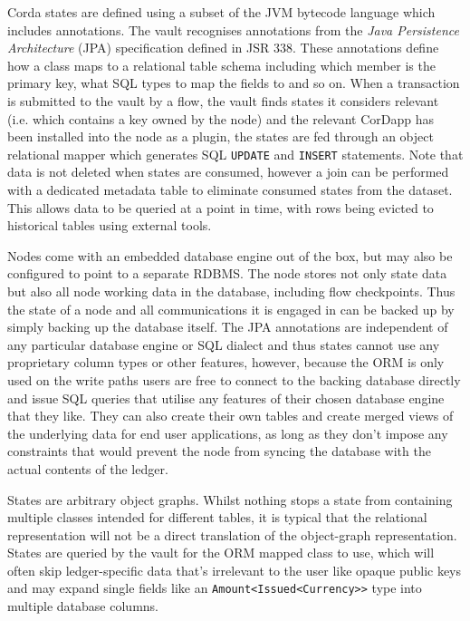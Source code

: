 \documentclass{article}
\begin{document}
Corda states are defined using a subset of the JVM bytecode language which includes annotations. The vault recognises
annotations from the \emph{Java Persistence Architecture} (JPA) specification defined in JSR 338\cite{JPA}.
These annotations define how a class maps to a relational table schema including which member is the primary key, what
SQL types to map the fields to and so on. When a transaction is submitted to the vault by a flow, the vault finds
states it considers relevant (i.e. which contains a key owned by the node) and the relevant CorDapp has been installed
into the node as a plugin, the states are fed through an object relational mapper which generates SQL \texttt{UPDATE}
and \texttt{INSERT} statements. Note that data is not deleted when states are consumed, however a join can be performed
with a dedicated metadata table to eliminate consumed states from the dataset. This allows data to be queried at a point
in time, with rows being evicted to historical tables using external tools.

Nodes come with an embedded database engine out of the box, but may also be configured to point to a separate RDBMS.
The node stores not only state data but also all node working data in the database, including flow checkpoints. Thus
the state of a node and all communications it is engaged in can be backed up by simply backing up the database itself.
The JPA annotations are independent of any particular database engine or SQL dialect and thus states cannot use any
proprietary column types or other features, however, because the ORM is only used on the write paths users are free
to connect to the backing database directly and issue SQL queries that utilise any features of their chosen database
engine that they like. They can also create their own tables and create merged views of the underlying data for end
user applications, as long as they don't impose any constraints that would prevent the node from syncing the database
with the actual contents of the ledger.


States are arbitrary object graphs. Whilst nothing stops a state from containing multiple classes intended for different
tables, it is typical that the relational representation will not be a direct translation of the object-graph
representation. States are queried by the vault for the ORM mapped class to use, which will often skip ledger-specific
data that's irrelevant to the user like opaque public keys and may expand single fields like an \texttt{Amount<Issued<Currency>>}
type into multiple database columns.
\end{document}
